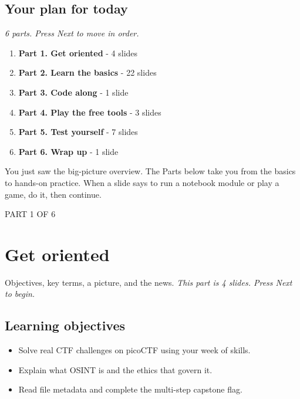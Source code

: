 \documentclass[12pt,openany]{book}
\begin{document}
\subsection*{Your plan for today}
{\small\itshape\color{gray}6 parts. Press Next to move in order.}


\begin{enumerate}
  \item \textbf{Part 1. Get oriented} - 4 slides
  \item \textbf{Part 2. Learn the basics} - 22 slides
  \item \textbf{Part 3. Code along} - 1 slide
  \item \textbf{Part 4. Play the free tools} - 3 slides
  \item \textbf{Part 5. Test yourself} - 7 slides
  \item \textbf{Part 6. Wrap up} - 1 slide
\end{enumerate}

You just saw the big-picture overview. The Parts below take you from the basics to hands-on practice. When a slide says to run a notebook module or play a game, do it, then continue.

\medskip

\vspace{4pt}\noindent\textsc{PART 1 OF 6}


\section*{Get oriented}

Objectives, key terms, a picture, and the news.
{\small\itshape\color{gray}This part is 4 slides. Press Next to begin.}

\medskip

\subsection*{Learning objectives}


\begin{itemize}

  \item Solve real CTF challenges on picoCTF using your week of skills.

  \item Explain what OSINT is and the ethics that govern it.

  \item Read file metadata and complete the multi-step capstone flag.

\end{itemize}
\end{document}
